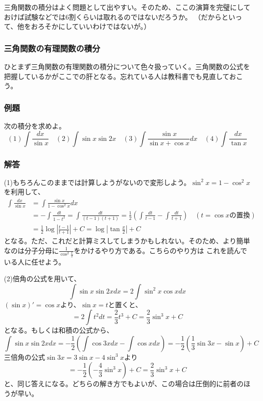 \documentclass[a4j,dvipdfmx]{jsarticle}
\begin{document}
三角関数の積分はよく問題として出やすい。そのため、ここの演算を完璧にしておけば試験などでは6割くらいは取れるのではないだろうか。
（だからといって、他をおろそかにしていいわけではないが。）
\subsubsection{三角関数の有理関数の積分}
ひとまず三角関数の有理関数の積分について色々扱っていく。三角関数の公式を把握しているかがここでの肝となる。忘れている人は教科書でも見直しておこう。
\subsubsection*{例題}
次の積分を求めよ。\\
\begin{equation*}
    (1)\int \frac{dx}{\sin x}\quad (2)\int \sin x\sin 2x\quad
    (3)\int \frac{\sin x}{\sin x+\cos x}dx\quad (4)\int\frac{dx}{\tan x}
\end{equation*}
\subsubsection*{解答}
(1)もちろんこのままでは計算しようがないので変形しよう。$\sin^2 x=1-\cos^2 x$を利用して、
\begin{align*}
    \int \frac{dx}{\sin x}&=\int \frac{\sin x}{1-\cos^2 x}dx\\
    &=-\int \frac{dt}{1-t^2}=\int\frac{dt}{(t-1)(t+1)}=\frac{1}{2}(\int \frac{dt}{t-1}-\int\frac{dt}{t+1})\quad(\text{$t=\cos x$の置換})\\
    &=\frac{1}{2}\log\left|\frac{t-1}{t+1}\right|+C=\log\left|\tan\frac{x}{2}\right|+C
\end{align*}
となる。ただ、これだと計算ミスしてしまうかもしれない。そのため、より簡単なのは分子分母に$\frac{1}{\cos^2 \frac{x}{2}}$をかけるやり方である。こちらのやり方は
これを読んでいる人に任せよう。

(2)倍角の公式を用いて、
\begin{equation*}
    \int\sin x\sin 2xdx=2\int\sin^2 x\cos xdx
\end{equation*}
$(\sin x)'=\cos x$より、$\sin x=t$と置くと、
\begin{equation*}
    =2\int t^2 dt =\frac{2}{3}t^3+C=\frac{2}{3}\sin^3 x+C
\end{equation*}
となる。もしくは和積の公式から、
\begin{equation*}
    \int \sin x\sin2xdx=-\frac{1}{2}(\int \cos 3xdx-\int \cos xdx)=-\frac{1}{2}(\frac{1}{3}\sin 3x-\sin x)+C
\end{equation*}
三倍角の公式$\sin 3x=3\sin x-4\sin^3 x$より
\begin{equation*}
    =-\frac{1}{2}(-\frac{4}{3}\sin^3 x)+C=\frac{2}{3}\sin^3 x+C
\end{equation*}
と、同じ答えになる。どちらの解き方でもよいが、この場合は圧倒的に前者のほうが早い。
\end{document}
